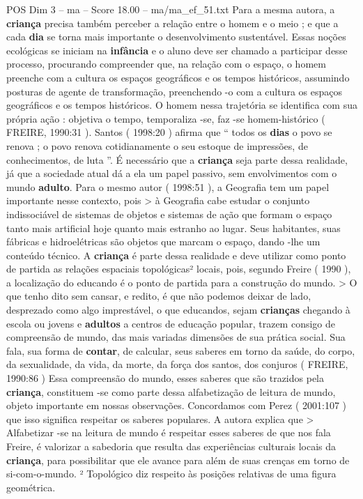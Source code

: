 \begin{textsample}{POS Dim 3 – ma – Score 18.00 – ma/ma\_ef\_51.txt}
Para a mesma autora, a \textbf{criança} precisa também perceber a relação entre o homem e o meio ; e que a cada \textbf{dia} se torna mais importante o desenvolvimento sustentável.
Essas noções ecológicas se iniciam na \textbf{infância} e o aluno deve ser chamado a participar desse processo, procurando compreender que, na relação com o espaço, o homem preenche com a cultura os espaços geográficos e os tempos históricos, assumindo posturas de agente de transformação, preenchendo -o com a cultura os espaços geográficos e os tempos históricos.
O homem nessa trajetória se identifica com sua própria ação : objetiva o tempo, temporaliza -se, faz -se homem-histórico ( FREIRE, 1990:31 ).
Santos ( 1998:20 ) afirma que “ todos os \textbf{dias} o povo se renova ; o povo renova cotidianamente o seu estoque de impressões, de conhecimentos, de luta ”.
É necessário que a \textbf{criança} seja parte dessa realidade, já que a sociedade atual dá a ela um papel passivo, sem envolvimentos com o mundo \textbf{adulto}.
Para o mesmo autor ( 1998:51 ), a Geografia tem um papel importante nesse contexto, pois > à Geografia cabe estudar o conjunto indissociável de sistemas de objetos e sistemas de ação que formam o espaço tanto mais artificial hoje quanto mais estranho ao lugar.
Seus habitantes, suas fábricas e hidroelétricas são objetos que marcam o espaço, dando -lhe um conteúdo técnico.
A \textbf{criança} é parte dessa realidade e deve utilizar como ponto de partida as relações espaciais topológicas² locais, pois, segundo Freire ( 1990 ), a localização do educando é o ponto de partida para a construção do mundo. > O que tenho dito sem cansar, e redito, é que não podemos deixar de lado, desprezado como algo imprestável, o que educandos, sejam \textbf{crianças} chegando à escola ou jovens e \textbf{adultos} a centros de educação popular, trazem consigo de compreensão de mundo, das mais variadas dimensões de sua prática social.
Sua fala, sua forma de \textbf{contar}, de calcular, seus saberes em torno da saúde, do corpo, da sexualidade, da vida, da morte, da força dos santos, dos conjuros ( FREIRE, 1990:86 ) Essa compreensão do mundo, esses saberes que são trazidos pela \textbf{criança}, constituem -se como parte dessa alfabetização de leitura de mundo, objeto importante em nossas observações.
Concordamos com Perez ( 2001:107 ) que isso significa respeitar os saberes populares.
A autora explica que > Alfabetizar -se na leitura de mundo é respeitar esses saberes de que nos fala Freire, é valorizar a sabedoria que resulta das experiências culturais locais da \textbf{criança}, para possibilitar que ele avance para além de suas crenças em torno de si-com-o-mundo. ² Topológico diz respeito às posições relativas de uma figura geométrica.

\end{textsample}
